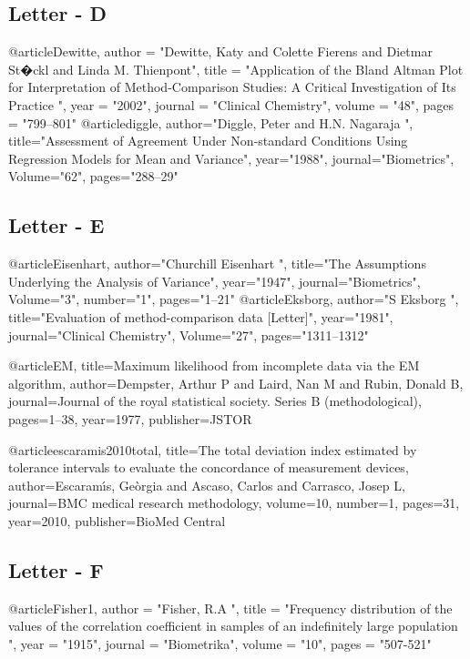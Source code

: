 \subsection*{Letter - D}





@article{Dewitte,
	author = "Dewitte, Katy and Colette Fierens and Dietmar St�ckl and Linda M. Thienpont",
	title = "Application of the {B}land {A}ltman Plot for Interpretation of Method-Comparison Studies: A Critical Investigation of Its Practice ",
	year = "2002",
	journal = "Clinical Chemistry",
	volume = "48",
	pages = "799--801"
}
@article{diggle,
	author="Diggle, Peter and H.N. Nagaraja ",
	title="Assessment of Agreement Under Non-standard Conditions Using
	Regression Models for Mean and Variance",
	year="1988",
	journal="Biometrics",
	Volume="62",
	pages="288--29"
}

\subsection*{Letter - E}



@article{Eisenhart,
	author="Churchill Eisenhart ",
	title="The Assumptions Underlying the Analysis of Variance",
	year="1947",
	journal="Biometrics",
	Volume="3",
	number="1",
	pages="1--21"
}
@article{Eksborg,
	author="S Eksborg ",
	title="Evaluation of method-comparison data [Letter]",
	year="1981",
	journal="Clinical Chemistry",
	Volume="27",
	pages="1311--1312"
}

@article{EM,
	title={Maximum likelihood from incomplete data via the EM algorithm},
	author={Dempster, Arthur P and Laird, Nan M and Rubin, Donald B},
	journal={Journal of the royal statistical society. Series B (methodological)},
	pages={1--38},
	year={1977},
	publisher={JSTOR}
}

@article{escaramis2010total,
	title={The total deviation index estimated by tolerance intervals to evaluate the concordance of measurement devices},
	author={Escaram{\'\i}s, Ge{\`o}rgia and Ascaso, Carlos and Carrasco, Josep L},
	journal={BMC medical research methodology},
	volume={10},
	number={1},
	pages={31},
	year={2010},
	publisher={BioMed Central}
}


\subsection*{Letter - F}

@article{Fisher1,
	author = "Fisher, R.A ",
	title = "Frequency distribution of the values of the correlation coefficient in samples of an indefinitely large population ",
	year = "1915",
	journal = "Biometrika",
	volume = "10",
	pages = "507-521"
}



